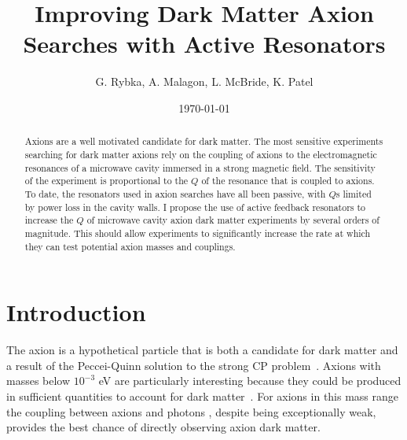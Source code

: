 \documentclass[aps,prl,twocolumn,groupedaddress]{revtex4-1}
\begin{document}
\title{Improving Dark Matter Axion Searches with Active Resonators}
\author{G. Rybka, A. Malagon, L. McBride, K. Patel}
\date{}                                           %

%

\date{\today}

\begin{abstract}
Axions are a well motivated candidate for dark matter.  The most sensitive experiments searching for dark matter axions rely on the coupling of axions to the electromagnetic resonances of a microwave cavity immersed in a strong magnetic field.  The sensitivity of the experiment is proportional to the $Q$ of the resonance that is coupled to axions.
To date, the resonators used in axion searches have all been passive, with $Q$s limited by power loss in the cavity walls.  I propose the use of active feedback resonators to increase the $Q$ of microwave cavity axion dark matter experiments by several orders of magnitude.
This should allow experiments to significantly increase the rate at which they can test potential axion masses and couplings.
\end{abstract}

\pacs{}

\maketitle

\section{Introduction} 

The axion is a hypothetical particle that is both a candidate for dark matter and a result of the Peccei-Quinn solution to the strong CP problem~\cite{Peccei,Peccei_2,PhysRevLett.40.223,PhysRevLett.40.279,Preskill1983127,Abbott1983,ipser-sikivie}.
Axions with masses below $10^{-3}$ eV are particularly interesting because they could be produced in sufficient quantities to account for 
dark matter~\cite{Turner199067}.
For axions in this mass range the coupling between axions and photons
, despite being exceptionally weak, provides the best chance of directly observing axion dark matter.
\end{document}
